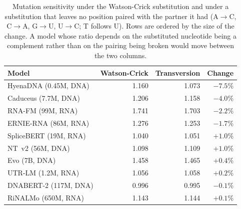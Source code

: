 \begin{table}[htbp]
\centering
\caption{Mutation sensitivity under the Watson-Crick substitution and under a
substitution that leaves no position paired with the partner it had (A$\to$C, C$\to$A, G$\to$U, U$\to$C; T
follows U). Rows are ordered by the size of the change. A model whose ratio
depends on the substituted nucleotide being a complement rather than on the
pairing being broken would move between the two columns.}
\label{tab:transversion}
\small
\begin{tabular}{lrrr}
\toprule
\textbf{Model} & \textbf{Watson-Crick} & \textbf{Transversion} & \textbf{Change} \\
\midrule
HyenaDNA (0.45M, DNA)      & 1.160 & 1.073 & $-7.5$\% \\
Caduceus (7.7M, DNA)       & 1.206 & 1.158 & $-4.0$\% \\
RNA-FM (99M, RNA)          & 1.741 & 1.703 & $-2.2$\% \\
ERNIE-RNA (86M, RNA)       & 1.276 & 1.253 & $-1.7$\% \\
SpliceBERT (19M, RNA)      & 1.040 & 1.051 & $+1.0$\% \\
NT~v2 (56M, DNA)           & 1.098 & 1.109 & $+1.0$\% \\
Evo (7B, DNA)              & 1.458 & 1.465 & $+0.4$\% \\
UTR-LM (1.2M, RNA)         & 1.056 & 1.058 & $+0.2$\% \\
DNABERT-2 (117M, DNA)      & 0.996 & 0.995 & $-0.1$\% \\
RiNALMo (650M, RNA)        & 1.143 & 1.144 & $+0.1$\% \\
\bottomrule
\end{tabular}
\end{table}
